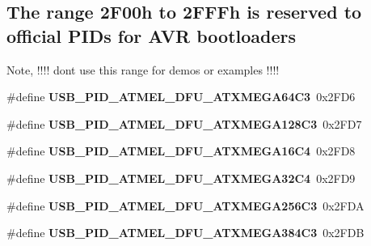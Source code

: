 \subsection*{The range 2\+F00h to 2\+F\+F\+Fh is reserved to official P\+I\+Ds for A\+VR bootloaders}
\label{_amgrp63dd31be8a71af76335a6cb0fbb010df}%
Note, !!!! don\textquotesingle{}t use this range for demos or examples !!!! \begin{DoxyCompactItemize}
\item 
\mbox{\label{group__usb__atmel__ids__group_ga8fb5df64469efbd7ecc89d98d4c35e5e}} 
\#define {\bfseries U\+S\+B\+\_\+\+P\+I\+D\+\_\+\+A\+T\+M\+E\+L\+\_\+\+D\+F\+U\+\_\+\+A\+T\+X\+M\+E\+G\+A64\+C3}~0x2\+F\+D6
\item 
\mbox{\label{group__usb__atmel__ids__group_ga24c35d7245c5642f884c44cd55e841f4}} 
\#define {\bfseries U\+S\+B\+\_\+\+P\+I\+D\+\_\+\+A\+T\+M\+E\+L\+\_\+\+D\+F\+U\+\_\+\+A\+T\+X\+M\+E\+G\+A128\+C3}~0x2\+F\+D7
\item 
\mbox{\label{group__usb__atmel__ids__group_ga4fe74ce8623c164892a3b210280a5f00}} 
\#define {\bfseries U\+S\+B\+\_\+\+P\+I\+D\+\_\+\+A\+T\+M\+E\+L\+\_\+\+D\+F\+U\+\_\+\+A\+T\+X\+M\+E\+G\+A16\+C4}~0x2\+F\+D8
\item 
\mbox{\label{group__usb__atmel__ids__group_ga2b850577d49ceddbaedb505747bc212d}} 
\#define {\bfseries U\+S\+B\+\_\+\+P\+I\+D\+\_\+\+A\+T\+M\+E\+L\+\_\+\+D\+F\+U\+\_\+\+A\+T\+X\+M\+E\+G\+A32\+C4}~0x2\+F\+D9
\item 
\mbox{\label{group__usb__atmel__ids__group_ga5787e9b21752badfdec0efd0c0e26c61}} 
\#define {\bfseries U\+S\+B\+\_\+\+P\+I\+D\+\_\+\+A\+T\+M\+E\+L\+\_\+\+D\+F\+U\+\_\+\+A\+T\+X\+M\+E\+G\+A256\+C3}~0x2\+F\+DA
\item 
\mbox{\label{group__usb__atmel__ids__group_gab5aedc52c8a460640ea8e75dd1d7e807}} 
\#define {\bfseries U\+S\+B\+\_\+\+P\+I\+D\+\_\+\+A\+T\+M\+E\+L\+\_\+\+D\+F\+U\+\_\+\+A\+T\+X\+M\+E\+G\+A384\+C3}~0x2\+F\+DB
\item 
\mbox{\label{group__usb__atmel__ids__group_ga1900799a18ce9b26d16290c4728305ef}} 

\end{DoxyCompactItemize}
